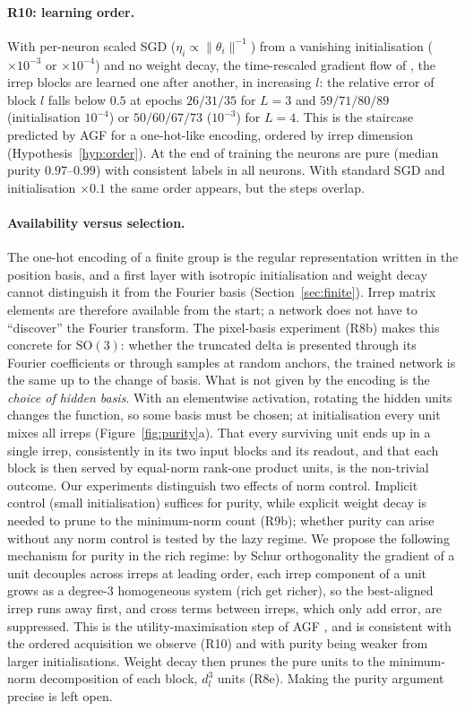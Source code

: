 \documentclass[a4paper,11pt]{article}
\theoremstyle{remark}
\theoremstyle{definition}
\newcommand{\SO}{\mathrm{SO}(3)}
\begin{document}
\paragraph{R10: learning order.} With per-neuron scaled SGD
($\eta_i\propto\|\theta_i\|^{-1}$) from a vanishing initialisation ($\times10^{-3}$ or
$\times10^{-4}$) and no weight decay, the time-rescaled gradient flow of
\cite{marchetti2026sequential,kunin2025agf}, the irrep blocks are learned one after
another, in increasing $l$: the relative error of block $l$ falls below $0.5$ at
epochs $26/31/35$ for $L=3$ and $59/71/80/89$ (initialisation $10^{-4}$) or
$50/60/67/73$ ($10^{-3}$) for $L=4$. This is the staircase predicted by AGF for a
one-hot-like encoding, ordered by irrep dimension (Hypothesis~\ref{hyp:order}).
At the end of training the neurons are pure (median purity $0.97$--$0.99$) with
consistent labels in all neurons. With standard SGD and initialisation $\times0.1$
the same order appears, but the steps overlap.

\paragraph{Availability versus selection.} The one-hot encoding of a finite group
is the regular representation written in the position basis, and a first layer
with isotropic initialisation and weight decay cannot distinguish it from the
Fourier basis (Section~\ref{sec:finite}). Irrep matrix elements are therefore
available from the start; a network does not have to ``discover'' the Fourier
transform. The pixel-basis experiment (R8b) makes this concrete for $\SO$: whether
the truncated delta is presented through its Fourier coefficients or through
samples at random anchors, the trained network is the same up to the change of
basis. What is not given by the encoding is the \emph{choice of hidden basis}.
With an elementwise activation, rotating the hidden units changes the function, so
some basis must be chosen; at initialisation every unit mixes all irreps
(Figure~\ref{fig:purity}a). That every surviving unit ends up in a single irrep,
consistently in its two input blocks and its readout, and that each block is then
served by equal-norm rank-one product units, is the non-trivial outcome. Our
experiments distinguish two effects of norm control. Implicit control (small
initialisation) suffices for purity, while explicit weight decay is needed to prune
to the minimum-norm count (R9b); whether purity can arise without any norm control
is tested by the lazy regime. We propose the following mechanism for purity in the
rich regime: by Schur orthogonality the
gradient of a unit decouples across irreps at leading order, each irrep component
of a unit grows as a degree-3 homogeneous system (rich get richer), so the
best-aligned irrep runs away first, and cross terms between irreps, which only add
error, are suppressed. This is the utility-maximisation step of AGF
\cite{kunin2025agf,marchetti2026sequential}, and is consistent with the ordered
acquisition we observe (R10) and with purity being weaker from larger
initialisations. Weight decay then prunes the pure units to the minimum-norm
decomposition of each block, $d_l^3$ units (R8e). Making the purity argument
precise is left open.
\end{document}
